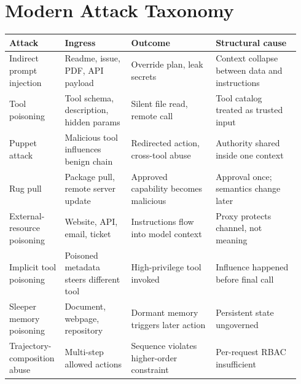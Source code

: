 \documentclass[10pt]{article}
\begin{document}
\section{Modern Attack Taxonomy}
\begin{longtable}{@{}p{0.16\linewidth}p{0.22\linewidth}p{0.28\linewidth}p{0.28\linewidth}@{}}
\toprule
\textbf{Attack} & \textbf{Ingress} & \textbf{Outcome} & \textbf{Structural cause} \\
\midrule
\endhead
Indirect prompt injection & Readme, issue, PDF, API payload & Override plan, leak secrets & Context collapse between data and instructions \\
Tool poisoning & Tool schema, description, hidden params & Silent file read, remote call & Tool catalog treated as trusted input \\
Puppet attack & Malicious tool influences benign chain & Redirected action, cross-tool abuse & Authority shared inside one context \\
Rug pull & Package pull, remote server update & Approved capability becomes malicious & Approval once; semantics change later \\
External-resource poisoning & Website, API, email, ticket & Instructions flow into model context & Proxy protects channel, not meaning \\
Implicit tool poisoning & Poisoned metadata steers different tool & High-privilege tool invoked & Influence happened before final call \\
Sleeper memory poisoning & Document, webpage, repository & Dormant memory triggers later action & Persistent state ungoverned \\
Trajectory-composition abuse & Multi-step allowed actions & Sequence violates higher-order constraint & Per-request RBAC insufficient \\
\bottomrule
\end{longtable}
\end{document}
